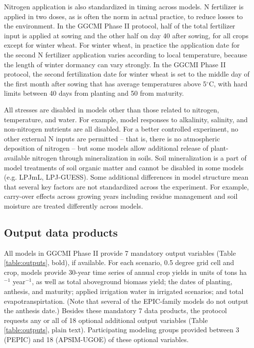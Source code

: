 \documentclass[gmd, manuscript]{copernicus} %
\begin{document}
Nitrogen application is also standardized in timing across models. 
N fertilizer is applied in two doses, as is often the norm in actual practice, to reduce losses to the environment. 
In the GGCMI Phase II protocol, half of the total fertilizer input is applied at sowing and the other half on day 40 after sowing, for all crops except for winter wheat. 
For winter wheat, in practice the application date for the second N fertilizer application varies according to local temperature, because the length of winter dormancy can vary strongly. 
In the GGCMI Phase II protocol, the second fertilization date for winter wheat is set to the middle day of the first month after sowing that has average temperatures above 5$^\circ$C, with hard limits between 40 days from planting and 50 from maturity.

All stresses are disabled in models other than those related to nitrogen, temperature, and water. 
For example, model responses to alkalinity, salinity, and non-nitrogen nutrients are all disabled. 
For a better controlled experiment, no other external N inputs are permitted -- that is, there is no atmospheric deposition of nitrogen --  but some models allow additional release of plant-available nitrogen through mineralization in soils. 
Soil mineralization is a part of model treatments of soil organic matter and cannot be disabled in some models (e.g. LPJmL, LPJ-GUESS). 
Some additional differences in model structure mean that several key factors are not standardized across the experiment. 
For example, carry-over effects across growing years including residue management and soil moisture are treated differently across models.

\subsection{Output data products}
All models in GGCMI Phase II provide 7 mandatory output variables (Table \ref{table:outputs}, bold), if available. 
For each scenario, 0.5 degree grid cell and crop, models provide 30-year time series of annual crop yields in units of tons ha$^{-1}$ year$^{-1}$, as well as total aboveground biomass yield; the dates of planting, anthesis, and maturity; applied irrigation water in irrigated scenarios; and total evapotranspirtation. 
(Note that several of the EPIC-family models do not output the anthesis date.)
Besides these mandatory 7 data products, the protocol requests any or all of 18 optional additional output variables (Table \ref{table:outputs}, plain text).
Participating modeling groups provided between 3 (PEPIC) and 18 (APSIM-UGOE) of these optional variables. 
\end{document}
